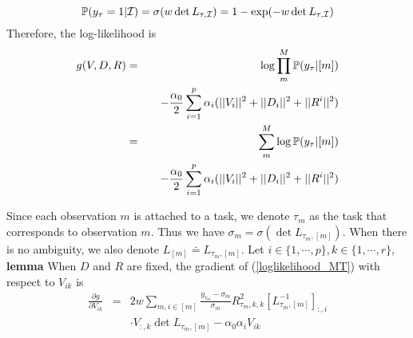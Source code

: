 \begin{equation}
\label{themodel_multitask}
\mathbb{P}(y_{\tau}=1|\mathcal{I}) = \sigma(w \det L_{\tau,\mathcal{I}})= 1-\exp(-w \det L_{\tau,\mathcal{I}}) 
\end{equation}
%
Therefore, the log-likelihood is
\begin{eqnarray}
\label{loglikelihood_MT}
g(V,D,R) & = & \log \prod_{m}^{M} \mathbb{P}(y_{\tau}|[m]) \\
& & \quad - \frac{\alpha_0}{2} \sum_{i=1}^p \alpha_i (||V_i||^2 + ||D_i||^2 + ||R^i||^2) \nonumber \\
& = & \sum_{m}^{M} \log \mathbb{P}(y_{\tau}|[m]) \\
& & \quad - \frac{\alpha_0}{2} \sum_{i=1}^p \alpha_i (||V_i||^2 + ||D_i||^2 + ||R^i||^2) \nonumber
\end{eqnarray}

\noindent
Since each observation $m$ is attached to a task, we denote $\tau_m$ as the task
that corresponds to observation $m$. Thus we have $\sigma_{m} = \sigma(\det
L_{\tau_m,[m]})$. When there is no ambiguity, we also denote $L_{[m]} \doteq
L_{\tau_m,[m]}$. Let $i \in
\{1, \cdots, p \}, k \in \{1, \cdots, r\}$, 
\\
\noindent
\textbf{lemma} When $D$ and $R$ are fixed, the gradient of (\ref{loglikelihood_MT}) with respect to $V_{ik}$ is
\begin{eqnarray}
\label{MT_Vgradient}
\frac{\partial g}{\partial V_{ik}} & = & 2 w \sum_{m, i \in [m]} \frac{y_{\tau_m}-\sigma_m}{\sigma_m} R_{\tau_m,k,k}^2 [L^{-1}_{\tau_m,[m]}]_{:,i} \nonumber \\
& & \cdot V_{:,k}  \det L_{\tau_m,[m]}  - \alpha_0 \alpha_i V_{ik} 
\end{eqnarray}

